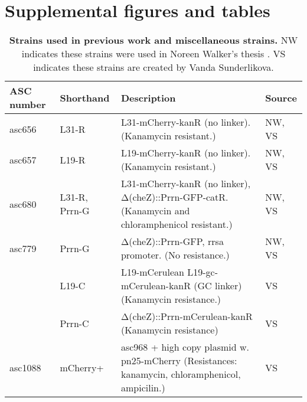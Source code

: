 \FloatBarrier
\clearpage

\section{Supplemental figures and tables}

\begin{table}[h]
    \begin{tabularx}{\textwidth}{llXl}
        \textbf{ASC number}	& \textbf{Shorthand} & \textbf{Description} & \textbf{Source}		\\
        \hline
        asc656	& L31-R & L31-mCherry-kanR (no linker).	(Kanamycin resistant.) & NW, VS \\
        asc657	& L19-R & L19-mCherry-kanR (no linker).	(Kanamycin resistant.) & NW, VS \\
        asc680	& L31-R, Prrn-G & L31-mCherry-kanR (no linker), Δ(cheZ)::Prrn-GFP-catR. (Kanamycin and chloramphenicol resistant.)	& NW, VS \\
        asc779	& Prrn-G& Δ(cheZ)::Prrn-GFP, rrsa promoter. (No resistance.) &	NW, VS \\
        
        \hline										
        & L19-C & 	L19-mCerulean L19-gc-mCerulean-kanR (GC linker)	(Kanamycin resistance.)	& VS \\
        & Prrn-C & 	Δ(cheZ)::Prrn-mCerulean-kanR	(Kanamycin resistance)	& VS \\
        \hline
        asc1088 & mCherry+
        &	asc968 + high copy plasmid w. pn25-mCherry (Resistances: kanamycin, chloramphenicol, ampicilin.) & VS \\
        \hline
    \end{tabularx}
    \caption{\textbf{Strains used in previous work and miscellaneous strains.} NW indicates these strains were used in Noreen Walker's thesis \cite{Walker2016t}. VS indicates these strains are created by Vanda Sunderlikova.}
\end{table}




